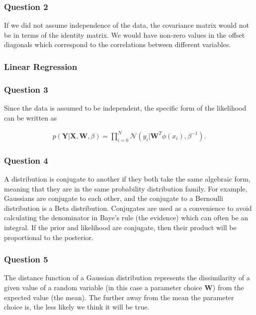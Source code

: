 \documentclass[10pt, a4paper, twocolumn]{article} %
\begin{document}

\subsubsection*{Question 2}
If we did not assume independence of the data, the covariance matrix would not be in terms of the identity matrix. We would have non-zero values in the offset diagonals which correspond to the correlations between different variables.

\subsubsection{Linear Regression}

\subsubsection*{Question 3}

Since the data is assumed to be independent, the specific form of the likelihood can be written as

\begin{align}
  p(\mathbf{Y} | \mathbf{X}, \mathbf{W}, \beta) = \prod_{i=0}^N \mathcal{N} (y_i | \mathbf{W}^T\phi(x_i), \beta^{-1}) .
\end{align}

\subsubsection*{Question 4}

A distribution is conjugate to another if they both take the same algebraic form, meaning that they are in the same probability distribution family. For example, Gaussians are conjugate to each other, and the conjugate to a Bernoulli distribution is a Beta distribution. Conjugates are used as a convenience to avoid calculating the denominator in Baye's rule (the evidence) which can often be an integral. If the prior and likelihood are conjugate, then their product will be proportional to the posterior.


\subsubsection*{Question 5}

The distance function of a Gaussian distribution represents the dissimilarity of a given value of a random variable (in this case a parameter choice $\mathbf{W}$) from the expected value (the mean). The further away from the mean the parameter choice is, the less likely we think it will be true.
\end{document}

